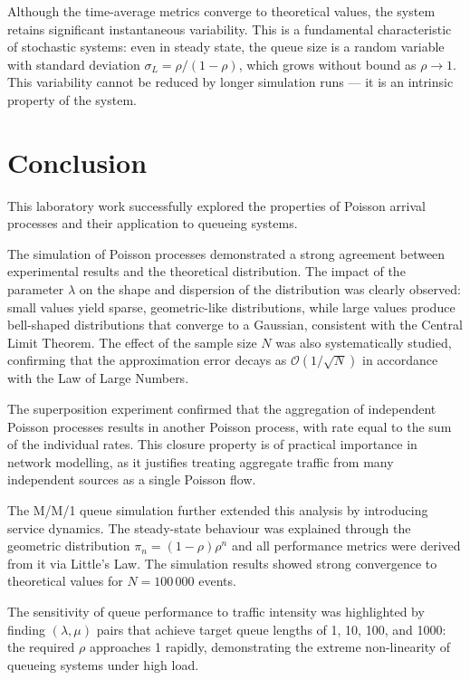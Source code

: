 \documentclass[12pt]{article}
\begin{document}
Although the time-average metrics converge to theoretical values, the system retains
significant instantaneous variability. This is a fundamental characteristic of stochastic
systems: even in steady state, the queue size is a random variable with standard deviation
$\sigma_{L} = \rho / (1-\rho)$, which grows without bound as $\rho \to 1$. This variability
cannot be reduced by longer simulation runs — it is an intrinsic property of the system.


\newpage

\section{Conclusion}

This laboratory work successfully explored the properties of Poisson arrival processes and their application to queueing systems.

The simulation of Poisson processes demonstrated a strong agreement between experimental results and the theoretical distribution. The impact of the parameter $\lambda$ on the shape and dispersion of the distribution was clearly observed: small values yield sparse, geometric-like distributions, while large values produce bell-shaped distributions that converge to a Gaussian, consistent with the Central Limit Theorem. The effect of the sample size $N$ was also systematically studied, confirming that the approximation error decays as $\mathcal{O}(1/\sqrt{N})$ in accordance with the Law of Large Numbers.

The superposition experiment confirmed that the aggregation of independent Poisson processes results in another Poisson process, with rate equal to the sum of the individual rates. This closure property is of practical importance in network modelling, as it justifies treating aggregate traffic from many independent sources as a single Poisson flow.

The M/M/1 queue simulation further extended this analysis by introducing service dynamics. The steady-state behaviour was explained through the geometric distribution $\pi_n = (1-\rho)\rho^n$ and all performance metrics were derived from it via Little's Law. The simulation results showed strong convergence to theoretical values for $N = 100\,000$ events.

The sensitivity of queue performance to traffic intensity was highlighted by finding $(\lambda, \mu)$ pairs that achieve target queue lengths of 1, 10, 100, and 1000: the required $\rho$ approaches 1 rapidly, demonstrating the extreme non-linearity of queueing systems under high load.
\end{document}
